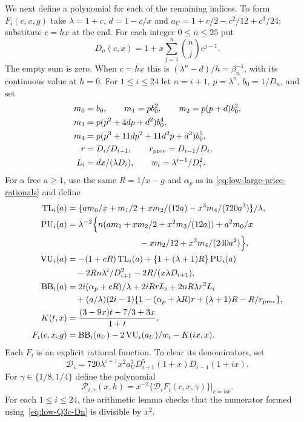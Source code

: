 We next define a polynomial for each of the remaining indices.
To form $F_i(c,x,g)$ take $\lambda=1+c$, $d=1-c/x$ and
$a_U=1+c/2-c^2/12+c^3/24$; substitute $c=hx$ at the end.  For each
integer $0\le n\le25$ put
\begin{equation}\label{eq:low-Q3c-Dn}
 D_n(c,x)=1+x\sum_{j=1}^n\binom nj c^{j-1}.
\end{equation}
The empty sum is zero.  When $c=hx$ this is
$(\lambda^n-d)/h=\beta_n^{-1}$, with its continuous value at
$h=0$.  For $1\le i\le24$ let $n=i+1$, $p=\lambda^n$,
$b_0=1/D_n$, and set
\begin{align*}
 m_0&=b_0,\qquad m_1=pb_0^2,\qquad m_2=p(p+d)b_0^3,\\
 m_3&=p(p^2+4dp+d^2)b_0^4,\\
 m_4&=p(p^3+11dp^2+11d^2p+d^3)b_0^5,\\
 r&=D_i/D_{i+1},\qquad r_{\rm prev}=D_{i-1}/D_i,\\
 L_i&=dx/(\lambda D_i),\qquad w_i=\lambda^{i-1}/D_i^2.
\end{align*}
For a free $a\ge1$, use the same $R=1/x-g$ and $\alpha_p$ as in
\eqref{eq:low-large-price-rationals} and define
\begin{align}
 \operatorname{TL}_i(a)&=
       \{am_0/x+m_1/2+x m_2/(12a)-x^3m_4/(720a^3)\}/\lambda,
 \nonumber\\
 \operatorname{PU}_i(a)&=\lambda^{-2}
 \Bigl\{n(am_1+x m_2/2+x^2m_3/(12a))+a^2m_0/x\nonumber\\
 &\hspace{30mm}-xm_2/12+x^3m_4/(240a^2)\Bigr\},
 \nonumber\\
 \operatorname{VU}_i(a)&=-(1+cR)\operatorname{TL}_i(a)
              +\{1+(\lambda+1)R\}\operatorname{PU}_i(a)\nonumber\\
 &\quad-2Rn\lambda^i/D_{i+1}^2-2R/(x\lambda D_{i+1}),
 \nonumber\\
 \operatorname{BB}_i(a)&=2i(\alpha_p+cR)/\lambda+2iRrL_i
       +2nR\lambda r^2L_i\nonumber\\
 &\quad+(a/\lambda)(2i-1)
              \{1-(\alpha_p+\lambda R)r+(\lambda+1)R-R/r_{\rm prev}\},
 \nonumber\\
 K(t,x)&=\frac{(3-9x)t-7/3+3x}{1+t},\nonumber\\
 F_i(c,x,g)&=\operatorname{BB}_i(a_U)
                   -2\operatorname{VU}_i(a_U)/w_i-K(ix,x).
 \label{eq:low-Q3c-head-rational}
\end{align}
Each $F_i$ is an explicit rational function. To clear its denominators, set
\begin{equation}\label{eq:low-Q3c-head-denominator}
 \mathcal D_i=720\lambda^{i+1}x^2a_U^3D_{i+1}^5
                                (1+x)D_{i-1}(1+ix).
\end{equation}
For $\gamma\in\{1/8,1/4\}$ define the polynomial
\begin{equation}\label{eq:low-Q3c-head-polynomial}
 \mathcal P_{i,\gamma}(x,h)
 =x^{-2}\left.\{\mathcal D_i F_i(c,x,\gamma)\}\right|_{c=hx}.
\end{equation}
For each $1\le i\le24$, the arithmetic lemma checks that the numerator
formed using~\eqref{eq:low-Q3c-Dn} is divisible by $x^2$.

